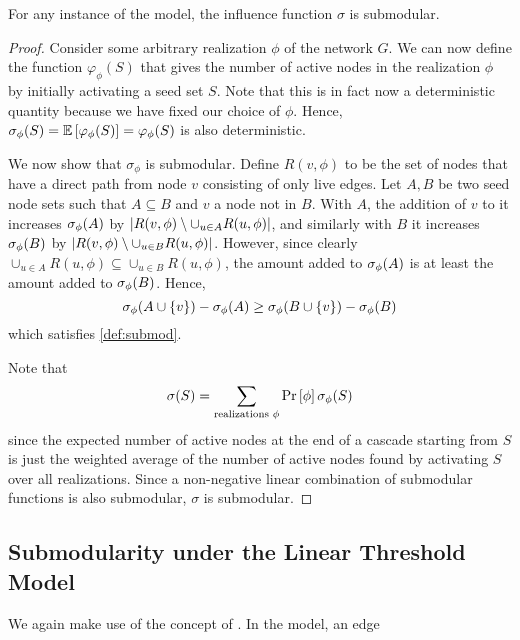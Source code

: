 \begin{theorem}
    For any instance of the \icmodel{} model, the influence function $\sigma$ is submodular.
    \label{thm:ic_submod}
\end{theorem}
\begin{proof}
    Consider some arbitrary realization $\phi$ of the network $G$. We can now define the function 
    $\varphi_{\phi}(S)$ that gives the number of active nodes in the realization $\phi$ by initially activating a seed set $S$. Note that this is in fact now a deterministic quantity because we have fixed our choice of $\phi$. Hence, $\sigma_{\phi} \! \left( S \right) = \operatorname*{\mathbb{E}} \left[  \varphi_{\phi} \! \left( S \right)  \right] = \varphi_{\phi} \! \left( S \right)$ is also deterministic. 
    
    We now show that $\sigma_{\phi}$ is submodular. Define $R(v, \phi)$ to be the set of nodes that have a direct path from node $v$ consisting of only live edges. Let $A, B$ be two seed node sets such that $A \subseteq B$ and $v$ a node not in $B$. With $A$, the addition of $v$ to it increases $\sigma_{\phi} \! \left( A \right)$ by $\left\lvert R(v, \phi) \setminus \cup_{u\in A} R(u, \phi) \right\rvert$, 
    and similarly with $B$ it increases $\sigma_{\phi} \! \left( B \right)$ by $\left\lvert R(v, \phi) \setminus \cup_{u\in B} R(u, \phi) \right\rvert$. However, since clearly $\cup_{u\in A} R(u, \phi) \subseteq \cup_{u\in B} R(u, \phi)$, the amount added to $\sigma_{\phi} \! \left( A \right)$ is at least the amount added to $\sigma_{\phi} \! \left( B \right)$. Hence, 
    \begin{equation*}
        \sigma_{\phi} \! \left( A \cup \left\{ v \right\} \right) - \sigma_{\phi} \! \left( A \right) \geq \sigma_{\phi} \! \left( B \cup \left\{ v \right\} \right) - \sigma_{\phi} \! \left( B \right)
    \end{equation*}
    which satisfies \cref{def:submod}. 
    
    Note that 
    \begin{equation*}
        \sigma \! \left( S \right) = \sum_{\text{realizations } \phi} \Pr \left[ \phi \right] \sigma_{\phi} \! \left( S \right)
    \end{equation*}
    since the expected number of active nodes at the end of a cascade starting from $S$ is just the weighted average of the number of active nodes found by activating $S$ over all realizations. Since a non-negative linear combination of submodular functions is also submodular, $\sigma$ is submodular. 
\end{proof}

\subsection{Submodularity under the Linear Threshold Model}
We again make use of the concept of \realization[realizations]. In the \ltmodel{} model, an edge